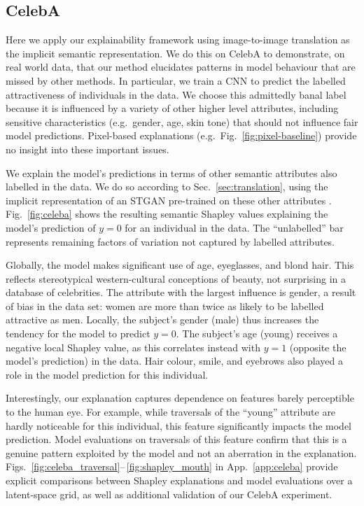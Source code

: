 \documentclass{article}
\DeclareRobustCommand{\Sec}[1]{Sec.~\ref{sec:#1}}
\DeclareRobustCommand{\App}[1]{App.~\ref{app:#1}}
\DeclareRobustCommand{\Fig}[1]{Fig.~\ref{fig:#1}}
\begin{document}
\subsection{CelebA}
\label{sec:celeba}


Here we apply our explainability framework using image-to-image translation as the implicit semantic representation. We do this on CelebA \citep{celeba15} to demonstrate, on real world data, that our method elucidates patterns in model behaviour that are missed by other methods. In particular, we train a CNN  to predict the labelled attractiveness of individuals in the data. We choose this admittedly banal label because it is influenced by a variety of other higher level attributes, including sensitive characteristics (e.g.~gender, age, skin tone) that should not influence fair model predictions. Pixel-based explanations (e.g.~\Fig{pixel-baseline}) provide no insight into these important issues.

We explain the model's predictions in terms of other semantic attributes also labelled in the data. We do so according to \Sec{translation}, using the implicit representation of an STGAN \citep{Stgan} pre-trained on these other attributes \citep{stgan_github}. \Fig{celeba} shows the resulting semantic Shapley values explaining the model's prediction of $y=0$ for an individual in the data. The ``unlabelled'' bar represents remaining factors of variation not captured by labelled attributes. 

Globally, the model makes significant use of age, eyeglasses, and blond hair. This reflects stereotypical western-cultural conceptions of beauty, not surprising in a database of celebrities. The attribute with the largest influence is gender, a result of bias in the data set: women are more than twice as likely to be labelled attractive as men. Locally, the subject's gender (male) thus increases the tendency for the model to predict $y=0$. The subject's age (young) receives a negative local Shapley value, as this correlates instead with $y=1$ (opposite the model's prediction) in the data. Hair colour, smile, and eyebrows also played a role in the model prediction for this individual.

Interestingly, our explanation captures dependence on features barely perceptible to the human eye. For example, while traversals of the ``young'' attribute are hardly noticeable for this individual, this feature significantly impacts the model prediction. Model evaluations on traversals of this feature confirm that this is a genuine pattern exploited by the model and not an aberration in the explanation. Figs.~\ref{fig:celeba_traversal}\;--\,\ref{fig:shapley_mouth} in \App{celeba} provide explicit comparisons between Shapley explanations and model evaluations over a  latent-space grid, as well as additional validation of our CelebA experiment.
\end{document}
